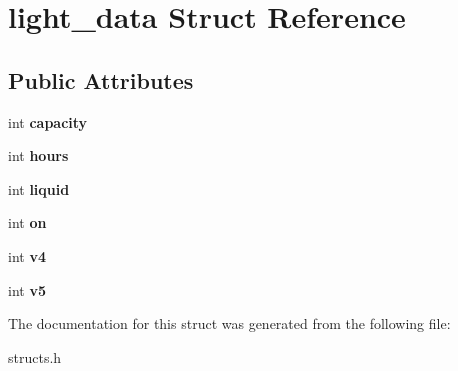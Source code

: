 \hypertarget{structlight__data}{\section{light\-\_\-data Struct Reference}
\label{structlight__data}
}
\subsection*{Public Attributes}
\begin{DoxyCompactItemize}
\item 
\hypertarget{structlight__data_a8bc24a597cb860b3a0891a8f0f6e6bd9}{int {\bfseries capacity}}\label{structlight__data_a8bc24a597cb860b3a0891a8f0f6e6bd9}

\item 
\hypertarget{structlight__data_a8679878a7afcc7278d2bf0a0d7b5e35d}{int {\bfseries hours}}\label{structlight__data_a8679878a7afcc7278d2bf0a0d7b5e35d}

\item 
\hypertarget{structlight__data_a789bceba8c793e1f731b12fb420c473c}{int {\bfseries liquid}}\label{structlight__data_a789bceba8c793e1f731b12fb420c473c}

\item 
\hypertarget{structlight__data_a3936b36b705f11be6ac709b90b720e58}{int {\bfseries on}}\label{structlight__data_a3936b36b705f11be6ac709b90b720e58}

\item 
\hypertarget{structlight__data_ab48231ec90350c1e7156e54a121be518}{int {\bfseries v4}}\label{structlight__data_ab48231ec90350c1e7156e54a121be518}

\item 
\hypertarget{structlight__data_a3deebe2d242690fa0e5963ba96236475}{int {\bfseries v5}}\label{structlight__data_a3deebe2d242690fa0e5963ba96236475}

\end{DoxyCompactItemize}


The documentation for this struct was generated from the following file\-:\begin{DoxyCompactItemize}
\item 
structs.\-h\end{DoxyCompactItemize}
